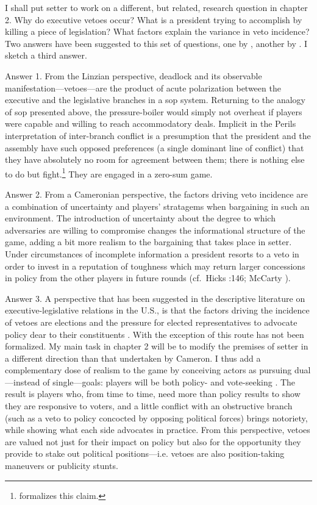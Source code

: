 I shall put setter to work on a different, but related, research question in chapter 2.  Why do executive vetoes occur?  What is a president trying to accomplish by killing a piece of legislation?  What factors explain the variance in veto incidence?  Two answers have been suggested to this set of questions, one by \citet{linz.1994}, another by \citet{cameron.2000}.  I sketch a third answer.  

Answer 1.  From the Linzian perspective, deadlock and its observable manifestation---vetoes---are the product of acute polarization between the executive and the legislative branches in a sop system.  Returning to the analogy of sop presented above, the pressure-boiler would simply not overheat if players were capable and willing to reach accommodatory deals.  Implicit in the Perils interpretation of inter-branch conflict is a presumption that the president and the assembly have such opposed preferences (a single dominant line of conflict) that they have absolutely no room for agreement between them; there is nothing else to do but fight.\footnote{\citet{magar.1998} formalizes this claim.}  They are engaged in a zero-sum game.  

Answer 2.  From a Cameronian perspective, the factors driving veto incidence are a combination of uncertainty and players' stratagems when bargaining in such an environment.  The introduction of uncertainty about the degree to which adversaries are willing to compromise changes the informational structure of the game, adding a bit more realism to the bargaining that takes place in setter.  Under circumstances of incomplete information a president resorts to a veto in order to invest in a reputation of toughness which may return larger concessions in policy from the other players in future rounds (cf.\ Hicks \citeyear{hicks.1932}:146; McCarty \citeyear{mccarty.1997}).  

Answer 3.  A perspective that has been suggested in the descriptive literature on executive-legislative relations in the U.S., is that the factors driving the incidence of vetoes are elections and the pressure for elected representatives to advocate policy dear to their constituents \citep{lee.1975,rohde.simon.1985,copeland.1983}.  With the exception of \citet{groseclose.mccarty.2001} this route has not been formalized.  My main task in chapter 2 will be to modify the premises of setter in a different direction than that undertaken by Cameron.  I thus add a complementary dose of realism to the game by conceiving actors as pursuing dual---instead of single---goals: players will be both policy- and vote-seeking \citep[cf.][]{strom.1990b}.  The result is players who, from time to time, need more than policy results to show they are responsive to voters, and a little conflict with an obstructive branch (such as a veto to policy concocted by opposing political forces) brings notoriety, while showing what each side advocates in practice.  From this perspective, vetoes are valued not just for their impact on policy but also for the opportunity they provide to stake out political positions---i.e. vetoes are also position-taking maneuvers or publicity stunts.  


